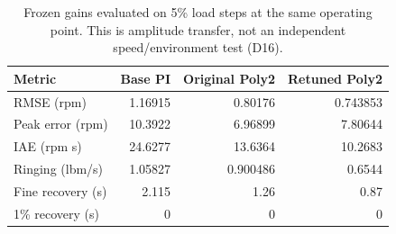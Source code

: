 \begin{table}[htbp]\centering\small\setlength{\tabcolsep}{4pt}\begin{tabular}{@{}lrrr@{}}\toprule
Metric & Base PI & Original Poly2 & Retuned Poly2\\\midrule
RMSE (rpm) & 1.16915 & 0.80176 & 0.743853\\
Peak error (rpm) & 10.3922 & 6.96899 & 7.80644\\
IAE (rpm s) & 24.6277 & 13.6364 & 10.2683\\
Ringing (lbm/s) & 1.05827 & 0.900486 & 0.6544\\
Fine recovery (s) & 2.115 & 1.26 & 0.87\\
1\% recovery (s) & 0 & 0 & 0\\
\bottomrule\end{tabular}\caption{Frozen gains evaluated on 5\% load steps at the same operating point. This is amplitude transfer, not an independent speed/environment test (D16).}\label{tab:validation}\end{table}